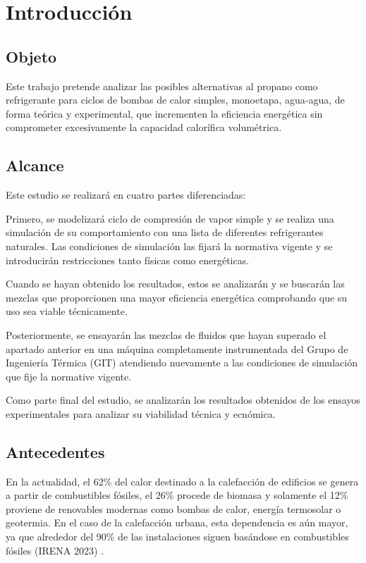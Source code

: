 \documentclass[../main.tex]{subfiles}
\begin{document}
\section{Introducción}


\subsection{Objeto}
Este trabajo pretende analizar las posibles alternativas al propano como refrigerante para ciclos de bombas de calor simples, monoetapa, agua-agua, de forma teórica y experimental, que incrementen la eficiencia energética sin comprometer excesivamente la capacidad calorífica volumétrica.


\subsection{Alcance}

Este estudio se realizará en cuatro partes diferenciadas:

Primero, se modelizará ciclo de compresión de vapor simple y se realiza una simulación de su comportamiento con una lista de diferentes refrigerantes naturales. Las condiciones de simulación las fijará la normativa vigente y se introducirán restricciones tanto físicas como energéticas.

Cuando se hayan obtenido los resultados, estos se analizarán y se buscarán las mezclas que proporcionen una mayor eficiencia energética comprobando que su uso sea viable técnicamente.

Posteriormente, se ensayarán las mezclas de fluidos que hayan superado el apartado anterior en una máquina completamente instrumentada del Grupo de Ingeniería Térmica (GIT) atendiendo nuevamente a las condiciones de simulación que fije la normative vigente.

Como parte final del estudio, se analizarán los resultados obtenidos de los ensayos experimentales para analizar su viabilidad técnica y ecnómica.


\subsection{Antecedentes}
En la actualidad, el 62\% del calor destinado a la calefacción de edificios se genera a partir de combustibles fósiles, el 26\% procede de biomasa y solamente el 12\% proviene de renovables modernas como bombas de calor, energía termosolar o geotermia. En el caso de la calefacción urbana, esta dependencia es aún mayor, ya que alrededor del 90\% de las instalaciones siguen basándose en combustibles fósiles (IRENA 2023) \cite{IRENA2023}.
\end{document}
